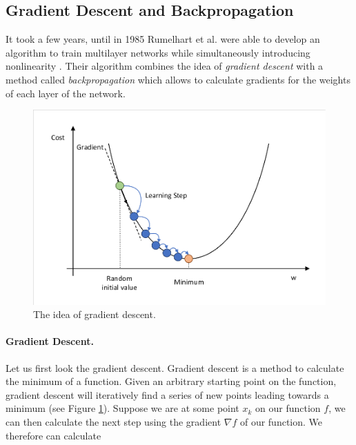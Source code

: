 \subsection{Gradient Descent and Backpropagation} \label{sec:Backpropagation}
It took a few years, until in 1985 Rumelhart et al. were able to develop an algorithm to train multilayer networks while simultaneously introducing nonlinearity \cite{rumelhart1985learning}. Their algorithm combines the idea of \textit{gradient descent} with a method called \textit{backpropagation} which allows to calculate gradients for the weights of each layer of the network.

\begin{figure}[ht]
  
  \begin{center}
      \includegraphics[trim=10px 10px 10px 10px, clip, width=0.75\columnwidth]{figures/deeplearning/GradientDescent.pdf}
  \end{center}
  
  \caption[Gradient Descent]{The idea of gradient descent.}
  \label{fig:GradientDescent}
\end{figure}

\paragraph{Gradient Descent.} Let us first look the gradient descent. Gradient descent is a method to calculate the minimum of a function. Given an arbitrary starting point on the function, gradient descent will iteratively find a series of new points leading towards a minimum (see Figure \ref{fig:GradientDescent}). Suppose we are at some point $x_k$ on our function $f$, we can then calculate the next step using the gradient $\nabla f$ of our function. We therefore can calculate 

